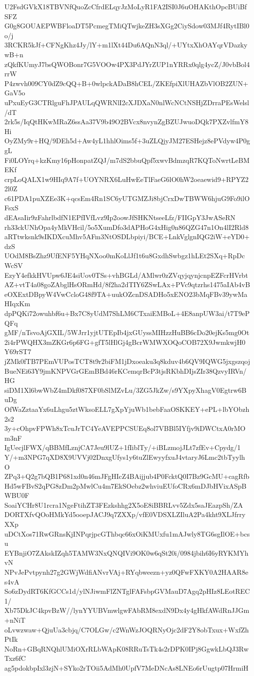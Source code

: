 U2FsdGVkX18TBVNfQuoZcCfrdELqyJzMoLyR1FA2ISI0J6uOHAKthOpcBUiBfSFZ
G0g8GOUAEPWBFloaDT5PcmegTMiQTwjkeZH3sXGg2CiySdow03MJf4RytIBl0o/j
3RCKR5kJf+CFNgKhz4Jy/lY+m1lXt44Du6AQnN3ql/+UYtxXhOAYqrVDazkywB+n
zQkfKUmyJ7bsQWOBonr7G5VOOw4PX3PdJYrZUP1nYRRx0qlg4ycZ/J0vbBol4rrW
P4zwvh009CY0dZ9cQQ+B+0wlpckADaB8hCEL/ZKEfpiXlUHAZbVlOB2ZUN+GaV5o
uPxuEyG3CTRlguFhJPAULqQWRNlI2cXJDXaN0nlWcNCtNSHjZDrraPEsWelsl/dT
2rk5s/IqQtHKwMRaZ6ssAa37V9b49O2BVcx8nvynZgBZUJwuoDQk7PXZvlfmY8Hi
OyZMy9r+HQ/9DEh5d+Aw4yL1hhlOims5f+3uZLQjyJM27ESHejz8ePVdyw4P0ggL
Fi0LOYrq+kzKmy16pHonpatZQJ/m7dS2bbuQpf5xwvBdmzqR7KQToNwrtLeBMEKf
crpLoQALX1w9HIq9A7f+UOYNRX6LuHwEeTlFaeG6lO0hW2oeaewid9+RPYZ22l0Z
c61PDA1puXZEe3K+qcsEm4Rn1SC6yUTGMZJi8bjCrxDwTBWW6hjuG9Fo9ilOFsxS
dEAsaIir9zFahrlbdfN1EPfIVfLvz9Ip2oowJfSHKNtseeLfz/FIIGpY3JwASeRN
rh33ckUNhOpa4yMkVHcil/5o5XumDfo3dAPHoG4xHig0n86QZG47n1On4lI2Rld8
aRTtwksnk9sIKDXcuMhv5AFm3NtOSDLbpiyi/BCE+LnkVglgnIQG2iW+eYD0+dzS
UOdM8BsZhz9UfENF5YHqNXoo0mKoLlJf1t6u8GxdhSwbgz1hLEt2SXq+RpDcWcSV
EzyY4efkkHVUpw6JE4siUov0TSs+vhBGLd/AMlwr0zZVqyjqynjcnpEZFcrHVrbt
AZ+vtT4a08goZAbglHsORmHd/8f2ha2dTIY6ZSwLAx+PVc9qtzrhs1475aIAb4vB
eOXExtDBpyW4VwCcloG48f9TA+uukOZcnDSADHo5xENO23bMqFBv39ywMaHIqxKm
dpPQKi72owuhbf6u+Bx7C8yUdM7ShLM6CTxaiEMBoL+4E8anpUW3ai/t7T9ePQFq
gMF/nTsvoAjGXIL/5WJrr1yjtUTEpIb4jxGUyssMIHzzHuBB6cDo20ejKs5mg0Ot
2i4rPWQHX3mZKGr6p6FG+gfT5lHlGj4gBcrWMWXOQoCOB72X9JwmkwjH0Y69rST7
jZMk0fTB7PEmVUPosTCT8t9r2biFM1jDxoeaku3q8kduv4b6QV9IQWG5jxgszqoj
BueNEi63Y9jmKNPVGrGEmBBd46rKCemqrBcP3tjsRKbhDIjsZIr38QzvyIRVn/HG
siDM1Xl6bwWbZ4mDkf087XF0bSlMZvLu/3ZG5JkZw/s9YXpyXhagV0Egtrw6BuDg
OfWaZztaaYx6uLhgu5ztWksoELL7gXpYjuWb1bebFaaOSKKEY+ePL+lbYObzh2s2
3y+cOhpvFPWh8xTcuJrTC4YeAVEPPCSUEq8ol7VBBl5IYfjv9iDWCtxA0rMOm3nF
IgUecjlFWX/qBBMfLznjCA7Jeu9lUZ+1fIiblTy/+iBLzmojJLt7zfEv+Cpydg/1
Y/+m3NPG7qXD8X9UVVj02DnxgUfys1y6tuZlEwyyfxuJ4vtaryJ6Lmc2tbTyylhO
ZPq3+Q2g7bQB1P681xd0n46mJFgHIcZ4BAijjub4P0FcktQ0I7Bz9GcMU+cagRfb
Hd5wFBvS2qPG8zDm2pMwlCu4m7EkSOebz2whviuEUfoCRx6mDJbHVixASpBWBU0F
SoaiYCHr8U1rcra1NgeFtihZT3FEzkshhg2X5oE8iBBRLvv5Zdx5saJEazpSh/ZA
DORTXfvQOoHMkYd5ooepJACJ9q7ZXXp/vfE0VDSXLZIluA2Pa4kht9XLJfrryXXp
uDCtXos71RwGRnsKjINPqrjpcGThbqc66xOiKMUxfu1mAJwly8TG6sgIlOE+bcsu
EYBnjiO7ZAkskIZqh5TAMW3NxQNQIVi9OK0w6qSt20i/0984jbih6I6yRYKMYhvN
NPvJePvtpynh27g2GWjWdfiANvrVAj+RYqbweezn+yz0QFwFXKY0A2HAAR8es4vA
So6zDydRT6KfGCCs1d/ylNJiwmFlZNTglFAFsbpGVMauD7Agq2pHIz8LEotREC1/
Xb75DkJC4kpvBzW//lynYYUBVmwlgwFAbRM8exdN9Dx4y4gHkfAWdRnJJGm+nNiT
oLvwzwaw+QjuUa3cbjq/C7OLGw/c2WnWzJOQRNyOjc2dF2Y8obTxux+WxfZhPtIk
NoRn+GBqRNQhlUMiOXrRLbWApK08RRuTsTk4s2rDPK0IPj8GgwkLbQJ3RwTxz6fC
ag5pdokbpIxl3zjN+SYko2rTOii5AdMh0UpfV7MeDNcAs8LNEo6rUugtp07HrmiH
